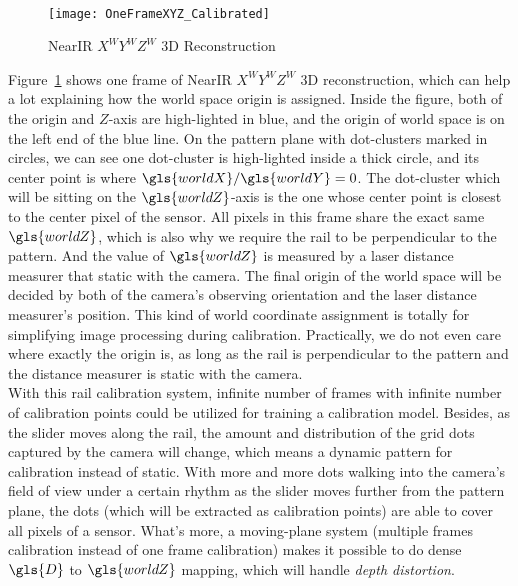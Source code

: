 %
%
\\\indent
\begin{figure}[!t]
\centering
\texttt{[image: OneFrameXYZ\_Calibrated]}
\caption{\gls{NearIR} \(X^{W}Y^{W}Z^{W}\) \gls{3D} Reconstruction}
\label{OneFrameXYZ_Calibrated}
\end{figure}%
%
Figure~\ref{OneFrameXYZ_Calibrated} shows one frame of \gls{NearIR} \(X^WY^WZ^W\) \gls{3D} reconstruction, which can help a lot explaining how the world space origin is assigned. Inside the figure, both of the origin and \(Z\)-axis are high-lighted in blue, and the origin of world space is on the left end of the blue line. On the pattern plane with dot-clusters marked in circles, we can see one dot-cluster is high-lighted inside a thick circle, and its center point is where \(\gls{worldX}/\gls{worldY} = 0\). The dot-cluster which will be sitting on the \(\gls{worldZ}\)-axis is the one whose center point is closest to the center pixel of the sensor. All pixels in this frame share the exact same \(\gls{worldZ}\), which is also why we require the rail to be perpendicular to the pattern. And the value of \(\gls{worldZ}\) is measured by a laser distance measurer that static with the camera. The final origin of the world space will be decided by both of the camera's observing orientation and the laser distance measurer's position. This kind of world coordinate assignment is totally for simplifying image processing during calibration.  Practically, we do not even care where exactly the origin is, as long as the rail is perpendicular to the pattern and the distance measurer is static with the camera.
\\\indent
With this rail calibration system, infinite number of frames with infinite number of calibration points could be utilized for training a calibration model. Besides, as the slider moves along the rail, the amount and distribution of the grid dots captured by the camera will change, which means a dynamic pattern for calibration instead of static. With more and more dots walking into the camera's field of view under a certain rhythm as the slider moves further from the pattern plane, the dots (which will be extracted as calibration points) are able to cover all pixels of a sensor. What's more, a moving-plane system (multiple frames calibration instead of one frame calibration) makes it possible to do dense \(\gls{D}\) to \(\gls{worldZ}\) mapping, which will handle \emph{depth distortion}.


